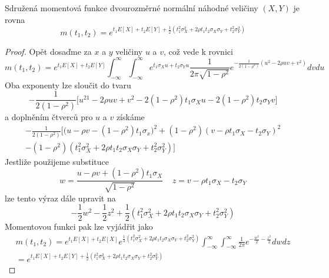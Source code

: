 \begin{theorem}
Sdružená momentová funkce dvourozměrné normální náhodné veličiny $(X,Y)$ je rovna
\begin{equation*}
m(t_1, t_2) = e^{t_1E[X] + t_2E[Y] + \frac{1}{2}(t_1^2 \sigma_X^2 + 2 \rho t_1 t_2 \sigma_X \sigma_Y + t_2^2 \sigma_Y^2)}
\end{equation*}
\end{theorem}

\begin{proof}
Opět dosaďme za $x$ a $y$ veličiny $u$ a $v$, což vede k rovnici
\begin{equation*}
m(t_1, t_2) = e^{t_1E[X] + t_2E[Y]} \int_{-\infty}^{\infty}  \int_{-\infty}^{\infty} e^{t_1 \sigma_X u + t_2 \sigma_Y u} \frac{1}{2 \pi \sqrt{1 - \rho^2}}e^{-\frac{1}{2(1 - \rho^2)}(u^2 - 2 \rho uv + v^2)}dv du
\end{equation*}
Oba exponenty lze sloučit do tvaru
\begin{equation*}
- \frac{1}{2(1 - \rho^2)}\big[u^21 - 2 \rho u v + v^2 - 2(1 - \rho^2)t_1 \sigma_Xu - 2(1 - \rho^2)t_2 \sigma_Y v \big]
\end{equation*}
a doplněním čtverců pro $u$ a $v$ získáme
\begin{gather*}
- \frac{1}{2(1 - \rho^2)}\Big[\big(u - \rho v - (1 - \rho^2)t_1 \sigma_x \big)^2 + (1 - \rho^2)(v - \rho t_1 \sigma_X - t_2 \sigma_Y)^2\\
	-(1 - \rho^2)(t_1^2 \sigma_X^2 + 2 \rho t_1 t_2 \sigma_X \sigma_Y + t_2^2 \sigma_Y^2)\Big]
\end{gather*}
Jestliže použijeme substituce
\begin{equation*}
w = \frac{u - \rho v + (1 - \rho^2)t_1 \sigma_X}{\sqrt{1 - \rho^2}} ~~~~~ z = v - \rho t_1 \sigma_X - t_2 \sigma_Y
\end{equation*}
lze tento výraz dále upravit na
\begin{equation*}
-\frac{1}{2}w^2 - \frac{1}{2}z^2 + \frac{1}{2}(t_1^2 \sigma_X^2 + 2 \rho t_1 t_2 \sigma_X \sigma_Y + t_2^2 \sigma_Y^2)
\end{equation*}
Momentovou funkci pak lze vyjádřit jako
\begin{gather*}
m(t_1, t_2) = e^{t_1 E[X] + t_2 E[X]}e^{\frac{1}{2}(t_1^2 \sigma_X^2 + 2 \rho t_1 t_2 \sigma_X \sigma_Y + t_2^2 \sigma_Y^2)}\int_{-\infty}^{\infty} \int_{-\infty}^{\infty} \frac{1}{2 \pi} e^{-\frac{w^2}{2} - \frac{z^2}{2}}dw dz\\
= e^{t_1 E[X] + t_2 E[Y] + \frac{1}{2}(t_1^2 \sigma_X^2 + 2 \rho t_1 t_2 \sigma_X \sigma_Y + t_2^2 \sigma_Y^2 )}
\end{gather*}
\end{proof}

